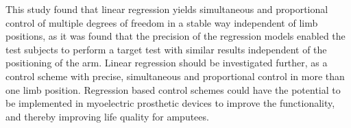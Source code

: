 
This study found that linear regression yields simultaneous and proportional control of multiple degrees of freedom in a stable way independent of limb positions, as it was found that the precision of the regression models enabled the test subjects to perform a target test with similar results independent of the positioning of the arm. Linear regression should be investigated further, as a control scheme with precise, simultaneous and proportional control in more than one limb position. Regression based control schemes could have the potential to be implemented in myoelectric prosthetic devices to improve the functionality, and thereby improving life quality for amputees.		
	

